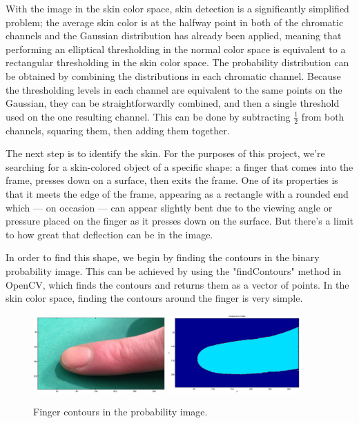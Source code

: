With the image in the skin color space, skin detection is a significantly simplified problem; the average skin color is at the halfway point in both of the chromatic channels and the Gaussian distribution has already been applied, meaning that performing an elliptical thresholding in the normal color space is equivalent to a rectangular thresholding in the skin color space. The probability distribution can be obtained by combining the distributions in each chromatic channel. Because the thresholding levels in each channel are equivalent to the same points on the Gaussian, they can be straightforwardly combined, and then a single threshold used on the one resulting channel. This can be done by subtracting $\frac{1}{2}$ from both channels, squaring them, then adding them together.

The next step is to identify the skin. For the purposes of this project, we're searching for a skin-colored object of a specific shape: a finger that comes into the frame, presses down on a surface, then exits the frame. One of its properties is that it meets the edge of the frame, appearing as a rectangle with a rounded end which --- on occasion --- can appear slightly bent due to the viewing angle or pressure placed on the finger as it presses down on the surface. But there's a limit to how great that deflection can be in the image.

In order to find this shape, we begin by finding the contours in the binary probability image. This can be achieved by using the "findContours" method in OpenCV, which finds the contours and returns them as a vector of points. In the skin color space, finding the contours around the finger is very simple.

\begin{figure}[h!]
  \centering
      \includegraphics[width=0.45\textwidth]{Chapter2/Figs/imgJIndex1.eps}
    \includegraphics[width=0.45\textwidth]{Chapter2/Figs/indexContours.eps}
    \caption{Finger contours in the probability image.}\label{fig:IndexContours}
\end{figure}

